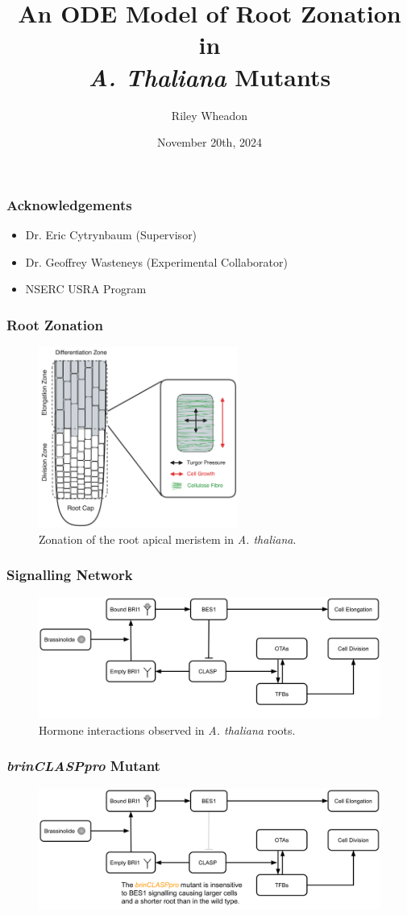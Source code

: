 \documentclass{beamer}
\title{An ODE Model of Root Zonation in \\ \emph{A. Thaliana} Mutants}
\author{Riley Wheadon}
\institute{University of British Columbia}
\date{November 20th, 2024}
\begin{document}
\frame{\titlepage}

\begin{frame}
\frametitle{Acknowledgements}
\begin{itemize}
  \item Dr. Eric Cytrynbaum (Supervisor)
  \item Dr. Geoffrey Wasteneys (Experimental Collaborator)
  \item NSERC USRA Program
\end{itemize}
\end{frame}

\begin{frame}
\frametitle{Root Zonation}
\begin{figure}
  \centering
  \includegraphics[height=16em]{root-zonation-simple.png}
  \caption{Zonation of the root apical meristem in \emph{A. thaliana}.}
\end{figure}
\end{frame}

\begin{frame}
\frametitle{Signalling Network}
\begin{figure}
  \centering
  \includegraphics[width=\textwidth]{network-wild-type.png}
  \caption{Hormone interactions observed in \emph{A. thaliana} roots.}
\end{figure}
\end{frame}

\begin{frame}
\frametitle{\emph{brinCLASPpro} Mutant}
\begin{figure}
  \centering
  \includegraphics[width=\textwidth]{network-brin-clasp.png}
\end{figure}
\end{frame}
\end{document}
